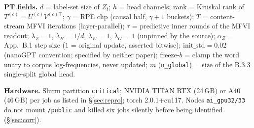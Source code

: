 \documentclass[10pt,a4paper]{article}
\begin{document}
\textbf{PT fields.} $d$ = label-set size of $Z_t$; $h$ = head channels; rank = Kruskal rank
of $T^{(c)}=U^{(c)}V^{(c)\top}$; $\gamma$ = RPE clip (causal half, $\gamma{+}1$ buckets);
$T$ = content-stream MFVI iterations (layer-parallel); $\tau$ = predictive inner rounds of
the MFVI readout; $\lambda_Z=1$, $\lambda_H=1/d$, $\lambda_W=1$, $\lambda_G=1$ (unpinned by
the source); $\alpha_Z$ = App.~B.1 step size ($1$ = original update, asserted bitwise);
$\mathrm{init\_std}=0.02$ (nanoGPT convention; specified by neither paper);
freeze-$b$ = clamp the word unary to corpus log-frequencies, never updated; $m$
(\texttt{n\_global}) = size of the B.3.3 single-split global head.

\textbf{Hardware.} Slurm partition \texttt{critical}; NVIDIA TITAN RTX (24\,GB) or A40
(46\,GB) per job as listed in \S\ref{sec:repro}; torch 2.0.1+cu117. Nodes
\texttt{ai\_gpu32/33} do not mount \texttt{/public} and killed six jobs silently before
being identified (\S\ref{sec:corr}).
\end{document}
